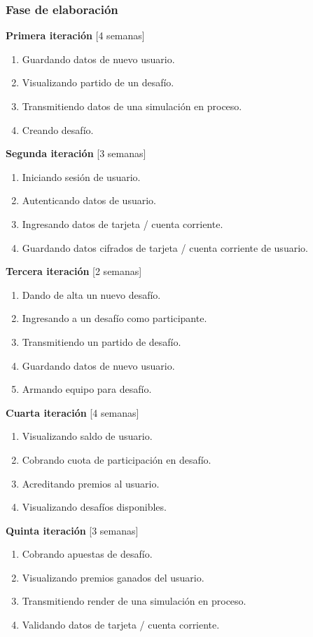 \documentclass[a4paper, 10pt, twoside]{article}
\begin{document}
\subsubsection{Fase de elaboración}

\textbf{Primera iteración} [4 semanas]
\begin{enumerate}
\item Guardando datos de nuevo usuario.
\item Visualizando partido de un desafío.
\item Transmitiendo datos de una simulación en proceso.
\item Creando desafío.
\end{enumerate}

\textbf{Segunda iteración} [3 semanas]
\begin{enumerate}
\item Iniciando sesión de usuario.
\item Autenticando datos de usuario.
\item Ingresando datos de tarjeta / cuenta corriente.
\item Guardando datos cifrados de tarjeta / cuenta corriente de usuario.
\end{enumerate}

\textbf{Tercera iteración} [2 semanas]
\begin{enumerate}
\item Dando de alta un nuevo desafío.
\item Ingresando a un desafío como participante.
\item Transmitiendo un partido de desafío.
\item Guardando datos de nuevo usuario.
\item Armando equipo para desafío.
\end{enumerate}

\textbf{Cuarta iteración} [4 semanas]
\begin{enumerate}
\item Visualizando saldo de usuario.
\item Cobrando cuota de participación en desafío.
\item Acreditando premios al usuario.
\item Visualizando desafíos disponibles.
\end{enumerate}

\textbf{Quinta iteración} [3 semanas]
\begin{enumerate}
\item Cobrando apuestas de desafío.
\item Visualizando premios ganados del usuario.
\item Transmitiendo render de una simulación en proceso.
\item Validando datos de tarjeta / cuenta corriente.
\end{enumerate}
\end{document}
